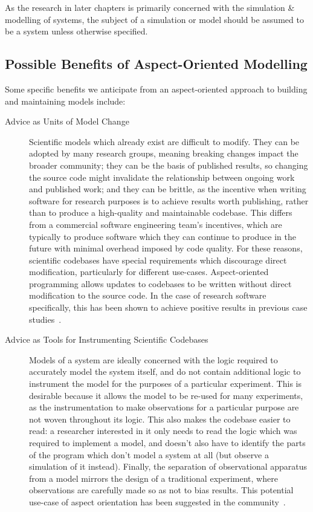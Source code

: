 As the research in later chapters is primarily concerned with the simulation \&
modelling of \sociotechnical systems, the subject of a simulation or model
should be assumed to be a \sociotechnical system unless otherwise specified.


\subsection{Possible Benefits of Aspect-Oriented Modelling}
Some specific benefits we anticipate from an aspect-oriented approach to
building and maintaining models include:

\begin{description}
  \item[Advice as Units of Model Change] Scientific models which already exist
    are difficult to modify. They can be adopted by many research groups,
    meaning breaking changes impact the broader community; they can be the basis
    of published results, so changing the source code might invalidate the
    relationship between ongoing work and published work; and they can be
    brittle, as the incentive when writing software for research purposes is to
    achieve results worth publishing, rather than to produce a high-quality and
    maintainable codebase. This differs from a commercial software engineering
    team's incentives, which are typically to produce software which they can
    continue to produce in the future with minimal overhead imposed by code
    quality. For these reasons, scientific codebases have special requirements
    which discourage direct modification, particularly for different use-cases.
    Aspect-oriented programming allows updates to codebases to be written
    without direct modification to the source code. In the case of research
    software specifically, this has been shown to achieve positive results in
    previous case studies~\cite{ionescu2009aspect}.

  \item[Advice as Tools for Instrumenting Scientific Codebases]
    Models of a system are ideally concerned with the logic required to
    accurately model the system itself, and do not contain additional logic to
    instrument the model for the purposes of a particular experiment. This is
    desirable because it allows the model to be re-used for many experiments, as
    the instrumentation to make observations for a particular purpose are not
    woven throughout its logic. This also makes the codebase easier to read: a
    researcher interested in it only needs to read the logic which was required
    to implement a model, and doesn't also have to identify the parts of the
    program which don't model a system at all (but observe a simulation of it
    instead). Finally, the separation of observational apparatus from a model
    mirrors the design of a traditional experiment, where observations are
    carefully made so as not to bias results. This potential use-case of aspect
    orientation has been suggested in the community~\cite{gulyas1999use}.


\end{description}
